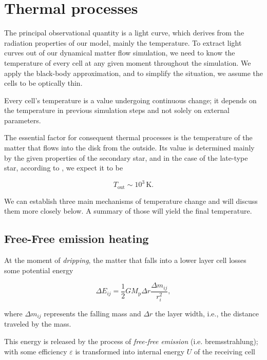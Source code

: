 \section{Thermal processes}
\label{sec:thermal_processes}

The principal observational quantity is a light curve, which derives from the radiation properties of our model, mainly the temperature. To extract light curves out of our dynamical matter flow simulation, we need to know the temperature of every cell at any given moment throughout the simulation. We apply the black-body approximation, and to simplify the situation, we assume the cells to be optically thin. 

Every cell's temperature is a value undergoing continuous change; it depends on the temperature in previous simulation steps and not solely on external parameters.

The essential factor for consequent thermal processes is the temperature of the matter that flows into the disk from the outside. Its value is determined mainly by the given properties of the secondary star, and in the case of the late-type star, according to \cite{allen1973}, we expect it to be

\begin{equation}
T_{\text{out}} \sim 10^3\, \mathrm{K}.
\end{equation}

We can establish three main mechanisms of temperature change and will discuss them more closely below. A summary of those will yield the final temperature. 

\subsection{Free-Free emission heating}

At the moment of \emph{dripping}, the matter that falls into a lower layer cell losses some potential energy \cite{yonehara1997} 

\begin{equation}
   \Delta E_{ij} = \frac{1}{2} G M_{\text{p}} \Delta r \frac{\Delta m_{ij}}{r_i^2},
   \label{eq:e_pot}
\end{equation}

where $\Delta m_{ij}$ represents the falling mass and $\Delta r$ the layer width, i.e., the distance traveled by the mass. 

This energy is released by the process of \emph{free-free emission} (i.e. bremsstrahlung); with some efficiency $\varepsilon$ is transformed into internal energy $U$ of the receiving cell

